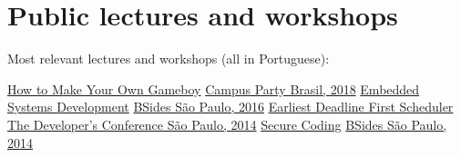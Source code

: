 \documentclass[]{cv-style}          %
\begin{document}
\section{Public lectures and workshops}
\vspace{-0.3cm}
\begin{entrylist}

\entry
{}
{Most relevant lectures and workshops (all in Portuguese):}
{}
{\vspace{-0.5cm}}

\entry
{}
{\href{https://www.slideshare.net/rafaelmmoreira/como-fazer-seu-prprio-gameboy-cpbr11}{How to Make Your Own Gameboy}}
{\href{https://campuse.ro/events/campus-party-brasil-2018/workshop/como-fazer-seu-proprio-gameboy-cpbr11/}{Campus Party Brasil, 2018}}
{\vspace{-0.5cm}}
\entry
{}
{\href{https://www.slideshare.net/rafaelmmoreira/desenvolvimento-de-sistemas-embarcados-do-hardware-ao-software}{Embedded Systems Development}}
{\href{https://sp13.securitybsides.com.br/detalhe-dos-treinamentos-e-apresentacoes/}{BSides São Paulo, 2016}}
{\vspace{-0.5cm}}
\entry
{}
{\href{https://www.slideshare.net/rafaelmmoreira/escalonador-earliest-deadline-first-tdc2014sp}{Earliest Deadline First Scheduler}}
{\href{https://thedevconf.com/tdc/2014/saopaulo/trilha-embedded}{The Developer's Conference São Paulo, 2014}}
{\vspace{-0.5cm}}
\entry
{}
{\href{https://www.slideshare.net/rafaelmmoreira/programao-segura}{Secure Coding}}
{\href{https://garoa.net.br/wiki/O_Outro_Lado_BSidesSP_ed_naovaitercopa/Lightning_Talks}{BSides São Paulo, 2014}}
{\vspace{-0.5cm}}

\end{entrylist}
{\vspace{-0.2cm}}
\end{document}
